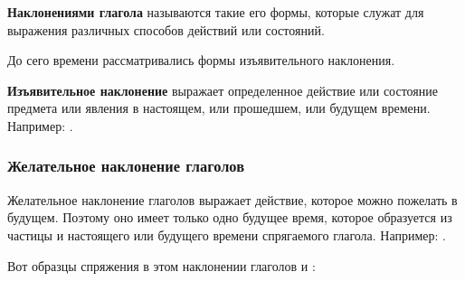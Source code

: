 \documentclass[11pt,a4paper,oneside]{memoir}
\begin{document}
    \textbf{Наклонениями глагола} называются такие его формы, которые служат для выражения различных способов действий или состояний.
    
    До сего времени рассматривались формы изъявительного наклонения.
    
    \textbf{Изъявительное наклонение} выражает определенное действие или состояние предмета или явления в настоящем, или прошедшем, или будущем времени. Например: {}.

                \subsubsection{Желательное наклонение глаголов}

    Желательное наклонение глаголов выражает действие, которое можно пожелать в будущем. Поэтому оно имеет только одно будущее время, которое образуется из частицы {} и настоящего или будущего времени спрягаемого глагола. Например: {}.
    
    Вот образцы спряжения в этом наклонении глаголов {} и {}:
\end{document}
